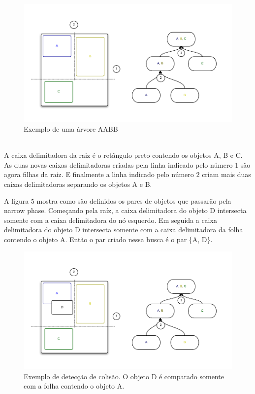 \begin{figure}[!htbp]
  \includegraphics[scale=0.4]{AABBTree.png}
  \caption{Exemplo de uma árvore AABB}
\end{figure}

\ \\
A caixa delimitadora da raiz é o retângulo preto contendo os objetos A, B e C.
As duas novas caixas delimitadoras criadas pela linha indicado pelo número 1 são agora filhas da raiz. 
E finalmente a linha indicado pelo número 2 criam mais duas caixas delimitadoras separando os objetos A e B.

A figura 5 mostra como são definidos os pares de objetos que passarão pela narrow phase. Começando pela raíz, a caixa delimitadora do objeto D intersecta somente 
com a caixa delimitadora do nó esquerdo. Em seguida a caixa delimitadora do objeto D intersecta somente com a caixa delimitadora da folha contendo o objeto A.
Então o par criado nessa busca é o par \{A, D\}.

\begin{figure}[!htbp]
  \includegraphics[scale=0.4]{AABBTree1.png}
  \caption{Exemplo de detecção de colisão. O objeto D é comparado somente com a folha contendo o objeto A.}
\end{figure}

